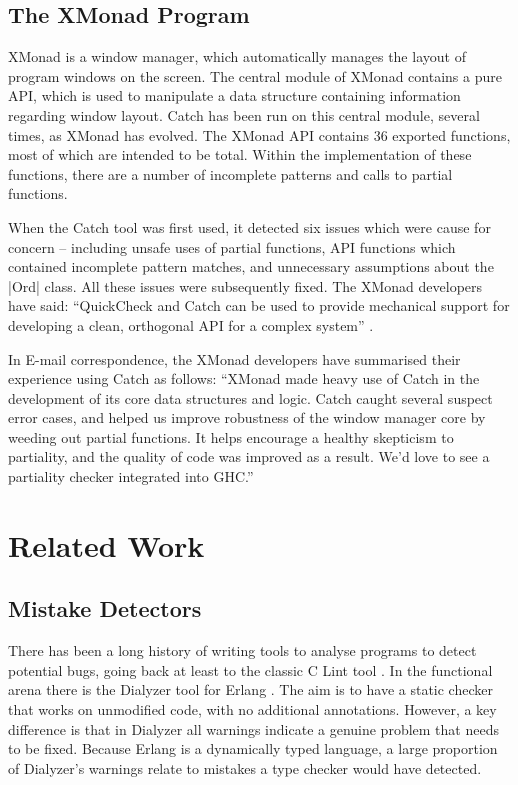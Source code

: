 \subsection{The XMonad Program}
\label{secC:xmonad}

XMonad \cite{xmonad} is a window manager, which automatically manages the layout of program windows on the screen. The central module of XMonad contains a pure API, which is used to manipulate a data structure containing information regarding window layout. Catch has been run on this central module, several times, as XMonad has evolved. The XMonad API contains 36 exported functions, most of which are intended to be total. Within the implementation of these functions, there are a number of incomplete patterns and calls to partial functions.

When the Catch tool was first used, it detected six issues which were cause for concern -- including unsafe uses of partial functions, API functions which contained incomplete pattern matches, and unnecessary assumptions about the |Ord| class. All these issues were subsequently fixed. The XMonad developers have said: ``QuickCheck and Catch can be used to provide mechanical support for developing a clean, orthogonal API for a complex system'' \cite{xmonad}.

In E-mail correspondence, the XMonad developers have summarised their experience using Catch as follows: ``XMonad made heavy use of Catch in the development of its core data structures and logic. Catch caught several suspect error cases, and helped us improve robustness of the window manager core by weeding out partial functions. It helps encourage a healthy skepticism to partiality, and the quality of code was improved as a result. We'd love to see a partiality checker integrated into GHC.''

\section{Related Work}
\label{secC:catch_related}

\subsection{Mistake Detectors}

There has been a long history of writing tools to analyse programs to detect potential bugs, going back at least to the classic C Lint tool \cite{lint}. In the functional arena there is the Dialyzer tool \cite{dialyzer} for Erlang \cite{erlang}. The aim is to have a static checker that works on unmodified code, with no additional annotations. However, a key difference is that in Dialyzer all warnings indicate a genuine problem that needs to be fixed. Because Erlang is a dynamically typed language, a large proportion of Dialyzer's warnings relate to mistakes a type checker would have detected.


